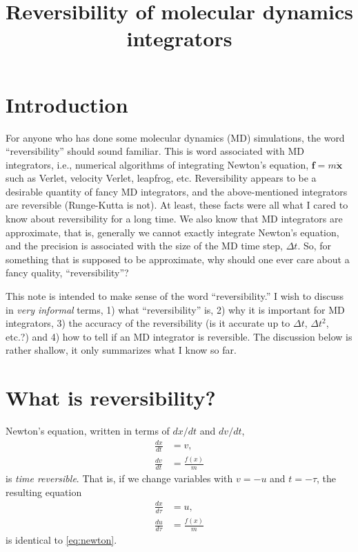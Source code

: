 \documentclass{article}
\begin{document}
\title{Reversibility of molecular dynamics integrators}
\author{ \vspace{-10ex} }
\date{ \vspace{-10ex} }
\maketitle

\section{Introduction}

For anyone who has done some molecular dynamics (MD) simulations,
the word ``reversibility'' should sound familiar.
%
This is word associated with MD integrators,
i.e., numerical algorithms of integrating Newton's equation,
$\mathbf f = m \ddot{\mathbf x}$
such as Verlet, velocity Verlet, leapfrog, etc.
%
Reversibility appears to be a desirable quantity
of fancy MD integrators,
and the above-mentioned integrators are reversible
(Runge-Kutta is not).
%
At least, these facts were all what I cared to know about reversibility
for a long time.
%
We also know that MD integrators are approximate,
that is, generally we cannot exactly integrate Newton's equation,
and the precision is associated with
the size of the MD time step, $\Delta t$.
%
So, for something that is supposed to be approximate,
why should one ever care about a fancy quality, ``reversibility''?
%



This note is intended to make sense of the word ``reversibility.''
%
I wish to discuss in \emph{very informal} terms,
1) what ``reversibility'' is,
2) why it is important for MD integrators,
3) the accuracy of the reversibility (is it accurate up to $\Delta t$,
$\Delta t^2$, etc.?)
and
4) how to tell if an MD integrator is reversible.
%
The discussion below is rather shallow,
it only summarizes what I know so far.


\section{What is reversibility?}

Newton's equation, written in terms of $dx/dt$ and $dv/dt$,
%
$$
\begin{aligned}
\frac{dx}{dt} &= v, \\
\frac{dv}{dt} &= \frac{f(x)}{m}
\end{aligned}
\label{eq:newton}
$$
%
is \emph{time reversible}. That is, if we change variables with
$v = -u$ and $t = -\tau$, the resulting equation
%
\begin{align}
\frac{dx}{d\tau} &= u, \\
\frac{du}{d\tau} &= \frac{f(x)}{m}
\end{align}
%
is identical to \eqref{eq:newton}.
\end{document}
